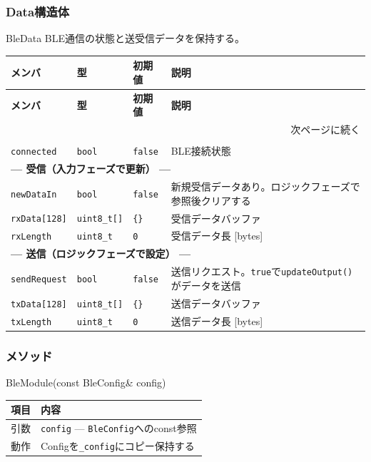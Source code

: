 \subsubsection{Data構造体}

\begin{funcblock}{BleData}
BLE通信の状態と送受信データを保持する。

\begin{longtable}{l l l p{3.8cm}}
\toprule
\textbf{メンバ} & \textbf{型} & \textbf{初期値} & \textbf{説明} \\
\midrule
\endfirsthead
\toprule
\textbf{メンバ} & \textbf{型} & \textbf{初期値} & \textbf{説明} \\
\midrule
\endhead
\midrule
\multicolumn{4}{r}{\small 次ページに続く} \\
\endfoot
\bottomrule
\endlastfoot
\multicolumn{4}{l}{\textbf{--- 接続状態 ---}} \\
\texttt{connected}   & \texttt{bool}    & \texttt{false} & BLE接続状態 \\
\midrule
\multicolumn{4}{l}{\textbf{--- 受信（入力フェーズで更新） ---}} \\
\texttt{newDataIn}   & \texttt{bool}    & \texttt{false} & 新規受信データあり。ロジックフェーズで参照後クリアする \\
\texttt{rxData[128]} & \texttt{uint8\_t[]} & \texttt{\{\}} & 受信データバッファ \\
\texttt{rxLength}    & \texttt{uint8\_t} & \texttt{0}    & 受信データ長 [bytes] \\
\midrule
\multicolumn{4}{l}{\textbf{--- 送信（ロジックフェーズで設定） ---}} \\
\texttt{sendRequest} & \texttt{bool}    & \texttt{false} & 送信リクエスト。\texttt{true}で\texttt{updateOutput()}がデータを送信 \\
\texttt{txData[128]} & \texttt{uint8\_t[]} & \texttt{\{\}} & 送信データバッファ \\
\texttt{txLength}    & \texttt{uint8\_t} & \texttt{0}    & 送信データ長 [bytes] \\
\end{longtable}
\end{funcblock}

\subsubsection{メソッド}

\begin{funcblock}{BleModule(const BleConfig\& config)}
\begin{tabularx}{\textwidth}{l X}
\toprule
\textbf{項目} & \textbf{内容} \\
\midrule
引数   & \texttt{config} --- \texttt{BleConfig}へのconst参照 \\
動作   & Configを\texttt{\_config}にコピー保持する \\
\bottomrule
\end{tabularx}
\end{funcblock}

